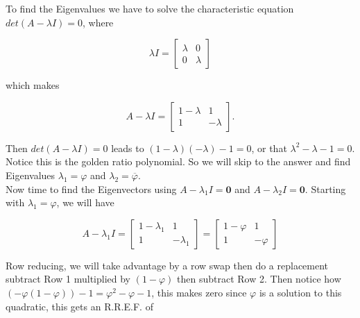 \documentclass{article}
\begin{document}
To find the Eigenvalues we have to solve the characteristic equation $det(A-\lambda I) = 0$, where

\begin{equation*}
    \lambda I=\begin{bmatrix}
        \lambda & 0 \\
        0 & \lambda
    \end{bmatrix}
\end{equation*}

which makes

\begin{equation*}
    A-\lambda I=\begin{bmatrix}
        1-\lambda & 1 \\
        1 & -\lambda
    \end{bmatrix}.
\end{equation*}

Then $det(A-\lambda I)=0$ leads to $(1-\lambda)(-\lambda)-1=0$, or that $\lambda^2-\lambda -1=0$. Notice this is the golden ratio polynomial. So we will skip to the answer and find Eigenvalues $\lambda_1=\varphi$ and $\lambda_2=\overline{\varphi}$. \\

Now time to find the Eigenvectors using $A-\lambda_1I=\mathbf{0}$ and $A-\lambda_2I=\mathbf{0}$. Starting with $\lambda_1=\varphi$, we will have

\begin{equation*}
    A-\lambda_1 I =
    \begin{bmatrix}
        1-\lambda_1 & 1 \\
        1 & -\lambda_1
    \end{bmatrix} = 
    \begin{bmatrix}
        1-\varphi & 1 \\
        1 & -\varphi
    \end{bmatrix}
\end{equation*}

Row reducing, we will take advantage by a row swap then do a replacement subtract Row 1 multiplied by $(1-\varphi)$ then subtract Row 2. Then notice how $(-\varphi(1- \varphi))-1=\varphi^2-\varphi-1$, this makes zero since $\varphi$ is a solution to this quadratic, this gets an R.R.E.F. of
\end{document}
